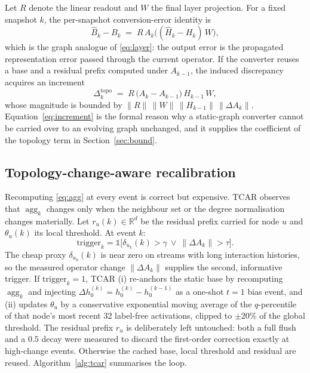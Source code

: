 \documentclass[preprint,12pt]{elsarticle}
\begin{document}
Let $R$ denote the linear readout and $W$ the final layer projection. For a fixed snapshot $k$, the per-snapshot conversion-error identity is
\begin{equation}
\hat B_k-B_k \;=\; R\,A_k\big((\hat H_k-H_k)\,W\big),
\label{eq:identity}
\end{equation}
which is the graph analogue of \eqref{eq:layer}: the output error is the propagated representation error passed through the current operator. If the converter reuses a base and a residual prefix computed under $A_{k-1}$, the induced discrepancy acquires an increment
\begin{equation}
\Delta^{\text{topo}}_k \;=\; R\,\big(A_k-A_{k-1}\big)\,H_{k-1}\,W ,
\label{eq:increment}
\end{equation}
whose magnitude is bounded by $\|R\|\,\|W\|\,\|H_{k-1}\|\,\|\Delta A_k\|$. Equation~\eqref{eq:increment} is the formal reason why a static-graph converter cannot be carried over to an evolving graph unchanged, and it supplies the coefficient of the topology term in Section~\ref{sec:bound}.

\subsection{Topology-change-aware recalibration}
\label{sec:tcar}

Recomputing \eqref{eq:agg} at every event is correct but expensive. TCAR observes that $\operatorname{agg}_k$ changes only when the neighbour set or the degree normalisation changes materially. Let $r_u(k)\in\mathbb R^d$ be the residual prefix carried for node $u$ and $\theta_u(k)$ its local threshold. At event $k$:
\begin{equation}
\text{trigger}_k=\mathbb 1\big[\delta_{u_k}(k)>\gamma\ \vee\ \|\Delta A_k\|>\tau\big].
\label{eq:gate}
\end{equation}
The cheap proxy $\delta_{u_k}(k)$ is near zero on streams with long interaction histories, so the measured operator change $\|\Delta A_k\|$ supplies the second, informative trigger. If $\text{trigger}_k=1$, TCAR (i) re-anchors the static base by recomputing $\operatorname{agg}_k$ and injecting $\Delta h_0^{(k)}=h_0^{(k)}-h_0^{(k-1)}$ as a one-shot $t{=}1$ bias event, and (ii) updates $\theta_u$ by a conservative exponential moving average of the $q$-percentile of that node's most recent 32 label-free activations, clipped to $\pm20\%$ of the global threshold. The residual prefix $r_u$ is deliberately left untouched: both a full flush and a $0.5$ decay were measured to discard the first-order correction exactly at high-change events. Otherwise the cached base, local threshold and residual are reused. Algorithm~\ref{alg:tcar} summarises the loop.
\end{document}
